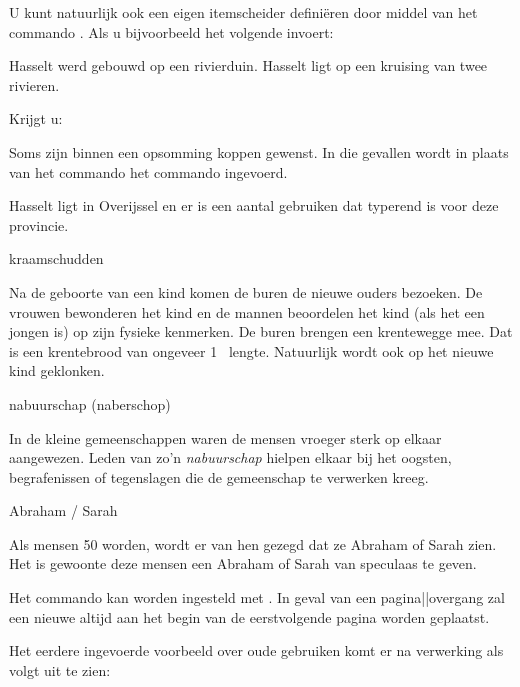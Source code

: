 U kunt natuurlijk ook een eigen itemscheider defini\"eren door
middel van het commando . Als u
bijvoorbeeld het volgende invoert:

\startbuffer
{}

\startopsomming[5,opelkaar]
\som Hasselt werd gebouwd op een rivierduin.
\som Hasselt ligt op een kruising van twee rivieren.
\stopopsomming
\stopbuffer

\typebuffer

Krijgt u:

\haalbuffer

Soms zijn binnen een opsomming koppen gewenst. In die gevallen
wordt in plaats van het commando \type{\som} het commando
\type{\kop} ingevoerd.

\startbuffer
Hasselt ligt in Overijssel en er is een aantal gebruiken dat
typerend is voor deze provincie.

\startopsomming

\kop kraamschudden

     Na de geboorte van een kind komen de buren de nieuwe
     ouders bezoeken. De vrouwen bewonderen het kind en de
     mannen beoordelen het kind (als het een jongen is) op
     zijn fysieke kenmerken. De buren brengen een
     krentewegge mee. Dat is een krentebrood van ongeveer 1
     \Meter\ lengte. Natuurlijk wordt ook op het nieuwe kind
     geklonken.

\kop nabuurschap (naberschop)

     In de kleine gemeenschappen waren de mensen vroeger
     sterk op elkaar aangewezen. Leden van zo'n {\em
     nabuurschap} hielpen elkaar bij het oogsten,
     begrafenissen of tegenslagen die de gemeenschap te
     verwerken kreeg.

\kop Abraham / Sarah

     Als mensen 50 worden, wordt er van hen gezegd dat ze
     Abraham of Sarah zien. Het is gewoonte deze mensen een
     Abraham of Sarah van speculaas te geven.

\stopopsomming
\stopbuffer

\typebuffer

Het commando \type{\kop} kan worden ingesteld met
\type{\stelopsommingin}. In geval van een pagina||overgang
zal een nieuwe \type{\kop} altijd aan het begin van de
eerstvolgende pagina worden geplaatst.

Het eerdere ingevoerde voorbeeld over oude gebruiken komt er
na verwerking als volgt uit te zien:

